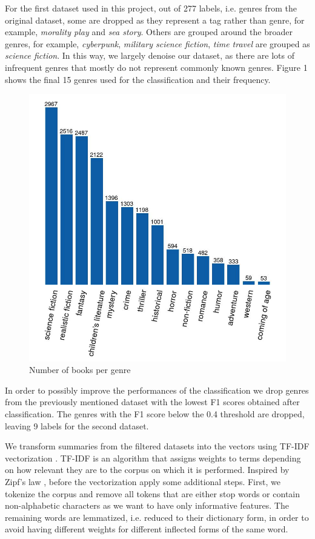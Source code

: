\documentclass{article}
\begin{document}
\par For the first dataset used in this project, out of 277 labels, i.e. genres from the original dataset, some are dropped as they represent a tag rather than genre, for example, \textit{morality play} and \textit{sea story}. Others are grouped around the broader genres, for example, \textit{cyberpunk}, \textit{military science fiction}, \textit{time travel} are grouped as \textit{science fiction}. In this way, we largely denoise our dataset, as there are lots of infrequent genres that mostly do not represent commonly known genres. Figure 1 shows the final 15 genres used for the classification and their frequency.
\newline
\begin{figure}
\centering
\includegraphics[width=\linewidth]{../../gfx/genrecounts.jpg}
\caption{Number of books per genre}
\label{fig:figure1}
\end{figure} 
\par In order to possibly improve the performances of the classification we drop genres from the previously mentioned dataset with the lowest F1 scores obtained after classification. The genres with the F1 score below the 0.4 threshold are dropped, leaving 9 labels for the second dataset.
\par We transform summaries from the filtered datasets into the vectors using TF-IDF vectorization \cite{ramos2003using}. TF-IDF is an algorithm that assigns weights to terms depending on how relevant they are to the corpus on which it is performed. Inspired by Zipf's law \cite{newman2005power}, before the vectorization apply some additional steps. First, we tokenize the corpus and remove all tokens that are either stop words or contain non-alphabetic characters as we want to have only informative features. The remaining words are lemmatized, i.e. reduced to their dictionary form, in order to avoid having different weights for different inflected forms of the same word.
\end{document}
